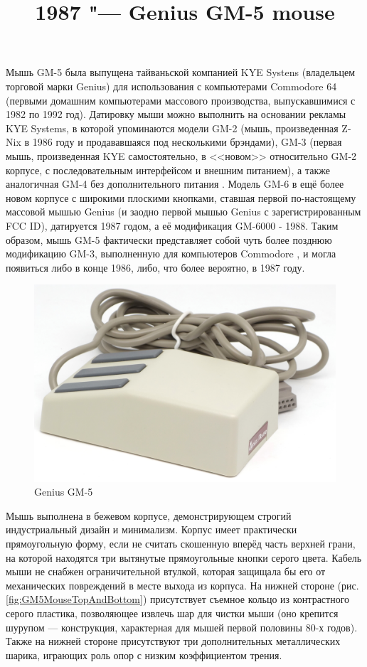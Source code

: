 \documentclass[11pt, a4paper]{article}
\begin{document}
\title{1987 "--- Genius GM-5 mouse}
\date{}
\maketitle
{}

Мышь GM-5 была выпущена тайваньской компанией KYE Systens (владельцем торговой марки  Genius) для использования с компьютерами Commodore 64 (первыми домашним компьютерами массового производства, выпускавшимися с 1982 по 1992 год). Датировку мыши можно выполнить на основании рекламы KYE Systems, в которой упоминаются модели GM-2 (мышь, произведенная Z-Nix в 1986 году и продававшаяся под несколькими брэндами), GM-3 (первая  мышь, произведенная KYE самостоятельно, в <<новом>> относительно GM-2 корпусе, с последовательным интерфейсом и внешним питанием), а также аналогичная GM-4 без дополнительного питания \cite{YourComputer}. Модель GM-6 в ещё более новом корпусе с широкими плоскими кнопками, ставшая первой по-настоящему массовой мышью Genius (и заодно первой мышью Genius с зарегистрированным FCC ID), датируется 1987 годом, а её модификация GM-6000 - 1988. Таким образом, мышь GM-5 фактически представляет собой чуть более позднюю модификацию GM-3, выполненную для компьютеров Commodore \cite{armadale}, и могла появиться либо в конце 1986, либо, что более вероятно, в 1987 году.

\begin{figure}[h]
   \centering
    \includegraphics[scale=0.77]{1987_genius_gm5_mouse/pic_30.jpg}
    \caption{Genius GM-5}
    \label{fig:GM5MousePic}
\end{figure}

Мышь выполнена в бежевом корпусе, демонстрирующем строгий индустриальный дизайн и минимализм. Корпус имеет практически прямоугольную форму, если не считать скошенную вперёд часть верхней грани, на которой находятся три вытянутые прямоугольные кнопки серого цвета. Кабель мыши не снабжен ограничительной втулкой, которая защищала бы его от механических повреждений в месте выхода из корпуса. На нижней стороне (рис. \ref{fig:GM5MouseTopAndBottom}) присутствует съемное кольцо из контрастного серого пластика, позволяющее извлечь шар для чистки мыши (оно крепится шурупом --- конструкция, характерная для мышей первой половины 80-х годов). Также на нижней стороне присутствуют три дополнительных металлических шарика, играющих роль опор с низким коэффициентом трения.
\end{document}

